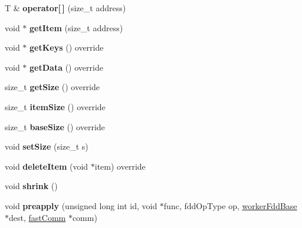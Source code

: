 \begin{DoxyCompactItemize}
\item 
\hypertarget{classfaster_1_1workerFddCore_ae16230a22ae23e4c2dde3a20f59c2f66}{}T \& {\bfseries operator\mbox{[}$\,$\mbox{]}} (size\+\_\+t address)\label{classfaster_1_1workerFddCore_ae16230a22ae23e4c2dde3a20f59c2f66}

\item 
\hypertarget{classfaster_1_1workerFddCore_a7753b4b41fa7c87676f7a6ef75a125cb}{}void $\ast$ {\bfseries get\+Item} (size\+\_\+t address)\label{classfaster_1_1workerFddCore_a7753b4b41fa7c87676f7a6ef75a125cb}

\item 
\hypertarget{classfaster_1_1workerFddCore_ae3768cc9c330c25c669611b5df3c5454}{}void $\ast$ {\bfseries get\+Keys} () override\label{classfaster_1_1workerFddCore_ae3768cc9c330c25c669611b5df3c5454}

\item 
\hypertarget{classfaster_1_1workerFddCore_ab4488656c0d99fc83be05e4c4cb65ea1}{}void $\ast$ {\bfseries get\+Data} () override\label{classfaster_1_1workerFddCore_ab4488656c0d99fc83be05e4c4cb65ea1}

\item 
\hypertarget{classfaster_1_1workerFddCore_a32bd4aca33e352d018a3bde34e7104d2}{}size\+\_\+t {\bfseries get\+Size} () override\label{classfaster_1_1workerFddCore_a32bd4aca33e352d018a3bde34e7104d2}

\item 
\hypertarget{classfaster_1_1workerFddCore_a68f16ce63e3bda36270a9f096e7bf007}{}size\+\_\+t {\bfseries item\+Size} () override\label{classfaster_1_1workerFddCore_a68f16ce63e3bda36270a9f096e7bf007}

\item 
\hypertarget{classfaster_1_1workerFddCore_aa56e4f3c789781c5e5745cb1a9f55032}{}size\+\_\+t {\bfseries base\+Size} () override\label{classfaster_1_1workerFddCore_aa56e4f3c789781c5e5745cb1a9f55032}

\item 
\hypertarget{classfaster_1_1workerFddCore_ae6834075d00c10b68b4ed8dc56a43ff1}{}void {\bfseries set\+Size} (size\+\_\+t s)\label{classfaster_1_1workerFddCore_ae6834075d00c10b68b4ed8dc56a43ff1}

\item 
\hypertarget{classfaster_1_1workerFddCore_aece15833d979a1315018b17426f9f943}{}void {\bfseries delete\+Item} (void $\ast$item) override\label{classfaster_1_1workerFddCore_aece15833d979a1315018b17426f9f943}

\item 
\hypertarget{classfaster_1_1workerFddCore_a9e9247a366e0a1e1b60c759ff9badb5c}{}void {\bfseries shrink} ()\label{classfaster_1_1workerFddCore_a9e9247a366e0a1e1b60c759ff9badb5c}

\item 
\hypertarget{classfaster_1_1workerFddCore_a4533454652b609e0cedb026ad1d3e881}{}void {\bfseries preapply} (unsigned long int id, void $\ast$func, fdd\+Op\+Type op, \hyperlink{classfaster_1_1workerFddBase}{worker\+Fdd\+Base} $\ast$dest, \hyperlink{classfaster_1_1fastComm}{fast\+Comm} $\ast$comm)\label{classfaster_1_1workerFddCore_a4533454652b609e0cedb026ad1d3e881}

\end{DoxyCompactItemize}
